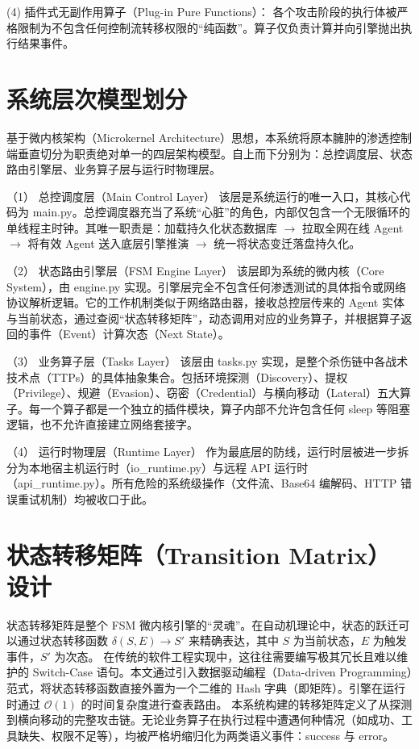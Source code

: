 \documentclass[twoside,openright]{xduugthesis}
\begin{document}
(4) 插件式无副作用算子（Plug-in Pure Functions）： 各个攻击阶段的执行体被严格限制为不包含任何控制流转移权限的“纯函数”。算子仅负责计算并向引擎抛出执行结果事件。


\section{系统层次模型划分}

基于微内核架构（Microkernel Architecture）思想\cite{bass2021software}，本系统将原本臃肿的渗透控制端垂直切分为职责绝对单一的四层架构模型。自上而下分别为：总控调度层、状态路由引擎层、业务算子层与运行时物理层。

（1） 总控调度层（Main Control Layer）
该层是系统运行的唯一入口，其核心代码为 main.py。总控调度器充当了系统“心脏”的角色，内部仅包含一个无限循环的单线程主时钟。其唯一职责是：加载持久化状态数据库 $\rightarrow$ 拉取全网在线 Agent $\rightarrow$ 将有效 Agent 送入底层引擎推演 $\rightarrow$ 统一将状态变迁落盘持久化。

（2） 状态路由引擎层（FSM Engine Layer）
该层即为系统的微内核（Core System），由 engine.py 实现。引擎层完全不包含任何渗透测试的具体指令或网络协议解析逻辑。它的工作机制类似于网络路由器，接收总控层传来的 Agent 实体与当前状态，通过查阅“状态转移矩阵”，动态调用对应的业务算子，并根据算子返回的事件（Event）计算次态（Next State）。

（3） 业务算子层（Tasks Layer）
该层由 tasks.py 实现，是整个杀伤链中各战术技术点（TTPs）的具体抽象集合。包括环境探测（Discovery）、提权（Privilege）、规避（Evasion）、窃密（Credential）与横向移动（Lateral）五大算子。每一个算子都是一个独立的插件模块，算子内部不允许包含任何 sleep 等阻塞逻辑，也不允许直接建立网络套接字。

（4） 运行时物理层（Runtime Layer）
作为最底层的防线，运行时层被进一步拆分为本地宿主机运行时（io_runtime.py）与远程 API 运行时（api_runtime.py）。所有危险的系统级操作（文件流、Base64 编解码、HTTP 错误重试机制）均被收口于此。

\section{状态转移矩阵（Transition Matrix）设计}

状态转移矩阵是整个 FSM 微内核引擎的“灵魂”。在自动机理论中，状态的跃迁可以通过状态转移函数 $\delta(S, E) \rightarrow S'$ 来精确表达，其中 $S$ 为当前状态，$E$ 为触发事件，$S'$ 为次态。
在传统的软件工程实现中，这往往需要编写极其冗长且难以维护的 Switch-Case 语句。本文通过引入数据驱动编程（Data-driven Programming）范式，将状态转移函数直接外置为一个二维的 Hash 字典（即矩阵）。引擎在运行时通过 $\mathcal{O}(1)$ 的时间复杂度进行查表路由。
本系统构建的转移矩阵定义了从探测到横向移动的完整攻击链。无论业务算子在执行过程中遭遇何种情况（如成功、工具缺失、权限不足等），均被严格坍缩归化为两类语义事件：success 与 error。
\end{document}

